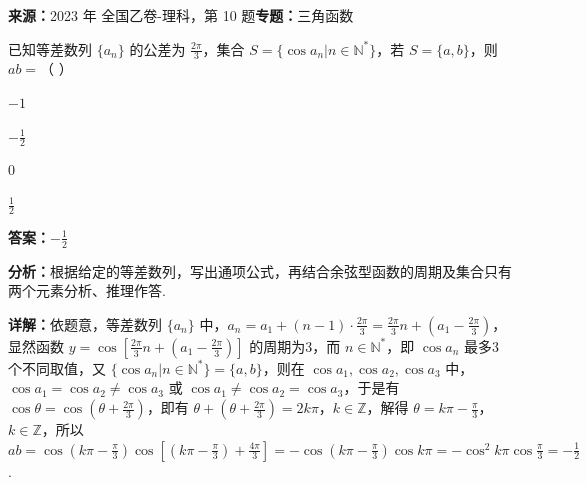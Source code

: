 \begin{question}[points=5]
\textbf{来源：}2023 年 全国乙卷-理科，第 10 题\quad \textbf{专题：}三角函数\par
已知等差数列 $\{a_n\}$ 的公差为 $\frac{2\pi}{3}$，集合 $S=\{\cos a_n|n\in\mathbb{N}^*\}$，若 $S=\{a,b\}$，则 $ab=$（ ）
\begin{choices}
  \item $-1$
  \item $-\frac{1}{2}$
  \item $0$
  \item $\frac{1}{2}$
\end{choices}
\begin{solution}
\textbf{答案：}$-\frac{1}{2}$

\textbf{分析：}根据给定的等差数列，写出通项公式，再结合余弦型函数的周期及集合只有两个元素分析、推理作答.

\textbf{详解：}依题意，等差数列 $\{a_n\}$ 中，$a_n=a_1+(n-1)\cdot\frac{2\pi}{3}=\frac{2\pi}{3}n+(a_1-\frac{2\pi}{3})$，显然函数 $y=\cos[\frac{2\pi}{3}n+(a_1-\frac{2\pi}{3})]$ 的周期为3，而 $n\in\mathbb{N}^*$，即 $\cos a_n$ 最多3个不同取值，又 $\{\cos a_n|n\in\mathbb{N}^*\}=\{a,b\}$，则在 $\cos a_1,\cos a_2,\cos a_3$ 中，$\cos a_1=\cos a_2\neq\cos a_3$ 或 $\cos a_1\neq\cos a_2=\cos a_3$，于是有 $\cos\theta=\cos(\theta+\frac{2\pi}{3})$，即有 $\theta+(\theta+\frac{2\pi}{3})=2k\pi$，$k\in\mathbb{Z}$，解得 $\theta=k\pi-\frac{\pi}{3}$，$k\in\mathbb{Z}$，所以 $ab=\cos(k\pi-\frac{\pi}{3})\cos[(k\pi-\frac{\pi}{3})+\frac{4\pi}{3}]=-\cos(k\pi-\frac{\pi}{3})\cos k\pi=-\cos^2 k\pi\cos\frac{\pi}{3}=-\frac{1}{2}$.
\end{solution}
\end{question}

